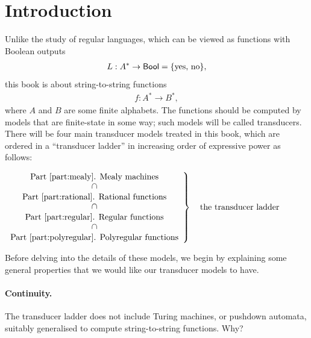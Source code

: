 \section*{Introduction}
Unlike the study of regular languages, which can be viewed as functions with Boolean outputs
\begin{align*}
L : A^* \to \mathsf{Bool} = \{\text{yes, no}\},
\end{align*}
this book is about string-to-string functions
\begin{align*}
f : A^* \to B^*,
\end{align*}
where $A$ and $B$ are some finite alphabets. The functions should  be computed by models that are finite-state in some way; such models will be called transducers. There will be four main transducer models treated in this book, which are ordered in a ``transducer ladder'' in  increasing order of expressive power as follows: 

\begin{center}
$\left.
\begin{array}{c}
    \text{Part~\ref{part:mealy}. Mealy machines} \\ 
    \rotatebox{90}{$\supset$} \\
    \text{Part~\ref{part:rational}. Rational functions} \\ 
    \rotatebox{90}{$\supset$} \\
    \text{Part~\ref{part:regular}. Regular functions} \\
    \rotatebox{90}{$\supset$} \\
    \text{Part~\ref{part:polyregular}. Polyregular functions}
\end{array}
\right\} \quad \text{the transducer ladder}$
\end{center}

Before delving into the details of these models, we begin by explaining some general properties that we would like our transducer models to have.  

\paragraph*{Continuity.} The transducer  ladder does not include Turing machines, or pushdown automata, suitably generalised to compute string-to-string functions. Why? 

